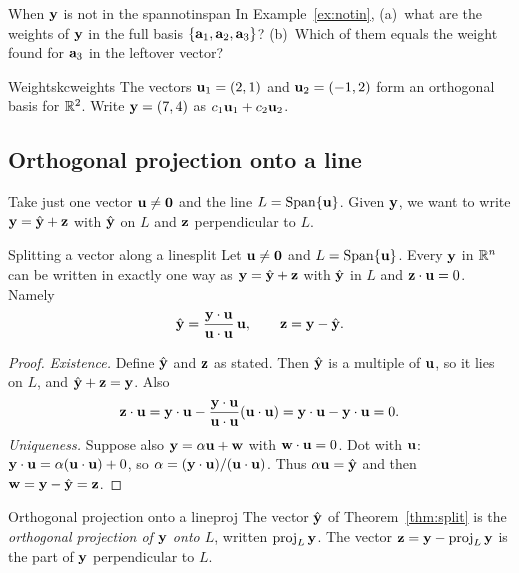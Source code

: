 \documentclass[11pt]{article}
\begin{document}
\begin{think}{When $\mathbf{y}$ is not in the span}{notinspan}
In Example~\ref{ex:notin}, (a)~what are the weights of $\mathbf{y}$ in the full basis $\{\mathbf{a}_1,\mathbf{a}_2,\mathbf{a}_3\}$? (b)~Which of them equals the weight found for $\mathbf{a}_3$ in the leftover vector?
\end{think}

\begin{kc}{Weights}{kcweights}
The vectors $\mathbf{u}_1=(2,1)$ and $\mathbf{u}_2=(-1,2)$ form an orthogonal basis for $\mathbb{R}^2$. Write $\mathbf{y}=(7,4)$ as $c_1\mathbf{u}_1+c_2\mathbf{u}_2$.
\end{kc}

\subsection*{Orthogonal projection onto a line}

Take just one vector $\mathbf{u}\neq\mathbf{0}$ and the line $L=\operatorname{Span}\{\mathbf{u}\}$. Given $\mathbf{y}$, we want to write $\mathbf{y}=\hat{\mathbf{y}}+\mathbf{z}$ with $\hat{\mathbf{y}}$ on $L$ and $\mathbf{z}$ perpendicular to $L$.

\begin{thm}{Splitting a vector along a line}{split}
Let $\mathbf{u}\neq\mathbf{0}$ and $L=\operatorname{Span}\{\mathbf{u}\}$. Every $\mathbf{y}$ in $\mathbb{R}^n$ can be written in exactly one way as $\mathbf{y}=\hat{\mathbf{y}}+\mathbf{z}$ with $\hat{\mathbf{y}}$ in $L$ and $\mathbf{z}\cdot\mathbf{u}=0$. Namely
\[
\hat{\mathbf{y}}=\frac{\mathbf{y}\cdot\mathbf{u}}{\mathbf{u}\cdot\mathbf{u}}\,\mathbf{u},\qquad\mathbf{z}=\mathbf{y}-\hat{\mathbf{y}} .
\]
\end{thm}

\begin{proof}
\emph{Existence.} Define $\hat{\mathbf{y}}$ and $\mathbf{z}$ as stated. Then $\hat{\mathbf{y}}$ is a multiple of $\mathbf{u}$, so it lies on $L$, and $\hat{\mathbf{y}}+\mathbf{z}=\mathbf{y}$. Also
\[
\mathbf{z}\cdot\mathbf{u}=\mathbf{y}\cdot\mathbf{u}-\frac{\mathbf{y}\cdot\mathbf{u}}{\mathbf{u}\cdot\mathbf{u}}(\mathbf{u}\cdot\mathbf{u})=\mathbf{y}\cdot\mathbf{u}-\mathbf{y}\cdot\mathbf{u}=0 .
\]
\emph{Uniqueness.} Suppose also $\mathbf{y}=\alpha\mathbf{u}+\mathbf{w}$ with $\mathbf{w}\cdot\mathbf{u}=0$. Dot with $\mathbf{u}$: $\mathbf{y}\cdot\mathbf{u}=\alpha(\mathbf{u}\cdot\mathbf{u})+0$, so $\alpha=(\mathbf{y}\cdot\mathbf{u})/(\mathbf{u}\cdot\mathbf{u})$. Thus $\alpha\mathbf{u}=\hat{\mathbf{y}}$ and then $\mathbf{w}=\mathbf{y}-\hat{\mathbf{y}}=\mathbf{z}$.
\end{proof}

\begin{defn}{Orthogonal projection onto a line}{proj}
The vector $\hat{\mathbf{y}}$ of Theorem~\ref{thm:split} is the \emph{orthogonal projection of $\mathbf{y}$ onto $L$}, written $\operatorname{proj}_L\mathbf{y}$. The vector $\mathbf{z}=\mathbf{y}-\operatorname{proj}_L\mathbf{y}$ is the part of $\mathbf{y}$ perpendicular to $L$.
\end{defn}
\end{document}
